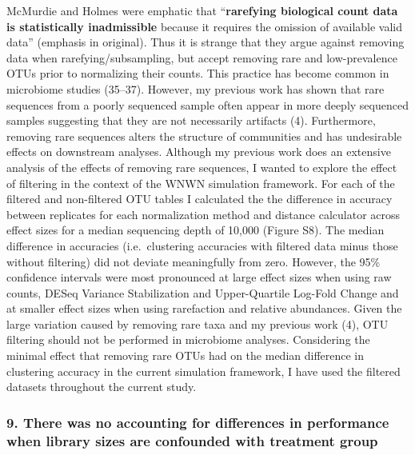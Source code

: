 \documentclass[
]{article}
\begin{document}
McMurdie and Holmes were emphatic that ``\textbf{rarefying biological
count data is statistically inadmissible} because it requires the
omission of available valid data'' (emphasis in original). Thus it is
strange that they argue against removing data when
rarefying/subsampling, but accept removing rare and low-prevalence OTUs
prior to normalizing their counts. This practice has become common in
microbiome studies (35--37). However, my previous work has shown that
rare sequences from a poorly sequenced sample often appear in more
deeply sequenced samples suggesting that they are not necessarily
artifacts (4). Furthermore, removing rare sequences alters the structure
of communities and has undesirable effects on downstream analyses.
Although my previous work does an extensive analysis of the effects of
removing rare sequences, I wanted to explore the effect of filtering in
the context of the WNWN simulation framework. For each of the filtered
and non-filtered OTU tables I calculated the the difference in accuracy
between replicates for each normalization method and distance calculator
across effect sizes for a median sequencing depth of 10,000 (Figure S8).
The median difference in accuracies (i.e.~clustering accuracies with
filtered data minus those without filtering) did not deviate
meaningfully from zero. However, the 95\% confidence intervals were most
pronounced at large effect sizes when using raw counts, DESeq Variance
Stabilization and Upper-Quartile Log-Fold Change and at smaller effect
sizes when using rarefaction and relative abundances. Given the large
variation caused by removing rare taxa and my previous work (4), OTU
filtering should not be performed in microbiome analyses. Considering
the minimal effect that removing rare OTUs had on the median difference
in clustering accuracy in the current simulation framework, I have used
the filtered datasets throughout the current study.

\hypertarget{there-was-no-accounting-for-differences-in-performance-when-library-sizes-are-confounded-with-treatment-group}{%
\subsubsection{9. There was no accounting for differences in performance
when library sizes are confounded with treatment
group}\label{there-was-no-accounting-for-differences-in-performance-when-library-sizes-are-confounded-with-treatment-group}}
\end{document}
